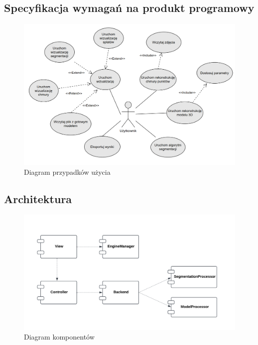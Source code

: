 \subsection{Specyfikacja wymagań na produkt programowy}

\begin{figure}[!htb]
    \includegraphics[width=1.0\linewidth]{img/diagramy/diagram_pu_3.png}
    \caption{Diagram przypadków użycia}\label{fig:use_case_diagram}
  \end{figure}

\subsection{Architektura}

\begin{figure}[!htb]
    \includegraphics[width=1.0\linewidth]{img/diagramy/diagram_komponentow.png}
    \caption{Diagram komponentów}\label{fig:components_diagram}
\end{figure}

